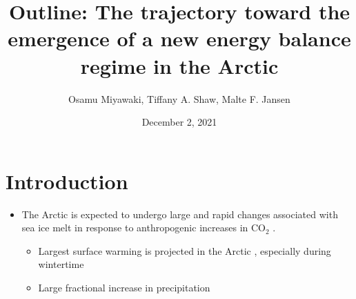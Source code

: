 \documentclass{article}
\title{Outline: The trajectory toward the emergence of a new energy balance regime in the Arctic}
\date{December 2, 2021}
\author{Osamu Miyawaki, Tiffany A. Shaw, Malte F. Jansen}
\begin{document}
\maketitle

\section*{Introduction}
\begin{itemize}
    \item The Arctic is expected to undergo large and rapid changes associated with sea ice melt in response to anthropogenic increases in CO$_2$ \citep{dai2019, feldl2020}.
    \begin{itemize}
        \item Largest surface warming is projected in the Arctic \citep[Arctic Amplification, e.g.][]{manabe1975, held1993a}, especially during wintertime \citep{lu2009}
        \item Large fractional increase in precipitation \citep{bintanja2014,siler2018,pithan2021}
    \end{itemize}


\end{itemize}
\end{document}
